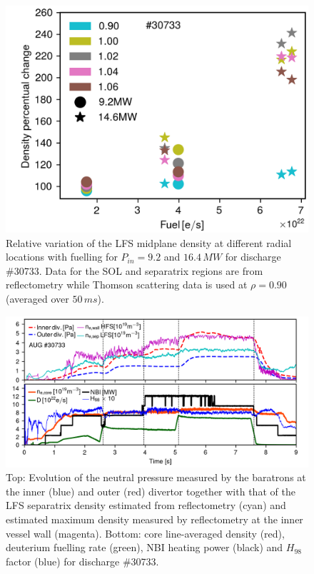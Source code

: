 \documentclass[12pt]{iopart}
\begin{document}
\begin{figure}[!bt]
\centering
\includegraphics[]{pres_fuel_30733.png}
\caption[Relative variation of the LFS midplane density for \#30733.]{Relative variation of the LFS midplane density at different radial locations with fuelling for $P_{in}=9.2$ and $16.4\,MW$ for discharge \#30733. 
Data for the SOL and separatrix regions are from reflectometry while Thomson scattering data is used at $\rho=0.90$  (averaged over $50\,ms$).}
\label{fig:pres_fuel_30733}
\end{figure}

\begin{figure}[!bt]
\centering
\includegraphics[]{neiw_30733.png}
\caption[Baratron neutral pressure evolution for \#30733.]{Top: Evolution of the neutral pressure measured by the baratrons at the inner (blue) and outer (red) divertor together with that of the LFS separatrix density estimated from reflectometry (cyan) and estimated maximum density measured by reflectometry at the inner vessel wall (magenta). Bottom: core line-averaged density (red), deuterium fuelling rate (green), NBI heating power (black) and $H_{98}$ factor (blue) for discharge \#30733.}
\label{fig:baratron_30733}
\end{figure}
\end{document}
